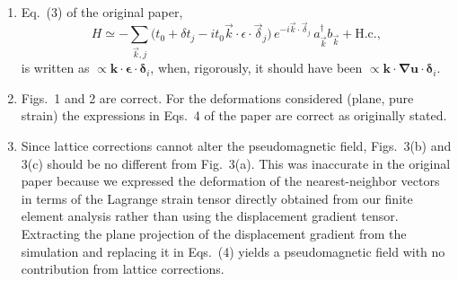 \begin{enumerate}
  \item Eq.~(3) of the original paper,
\begin{equation*}
  H \simeq -\sum_{\vec{k},j} \bigl(
  t_0 + \delta t_j - it_0\vec{k}\cdot\epsilon\cdot\vec{\delta}_j
  \bigr) \, e^{-i\vec{k}\cdot\vec{\delta}_j} \,
  a_{\vec{k}}^{\dagger}b_{\vec{k}} + \text{H.c.}
  ,
\end{equation*}
is written as $\propto \bm{k}\cdot\bm{\epsilon}\cdot\bm{\delta}_i$, when, rigorously, it should have been $\propto\bm{k}\cdot\bm{\nabla u}\cdot\bm{\delta}_i$.
  \item Figs.~1 and 2 are correct.  For the deformations considered (plane, pure strain) the expressions in Eqs.~4 of the paper are correct as originally stated.
  \item Since lattice corrections cannot alter the pseudomagnetic field, Figs.~3(b) and 3(c) should be no different from Fig.~3(a).  This was inaccurate in the original paper because we expressed the deformation of the nearest-neighbor vectors in terms of the Lagrange strain tensor directly obtained from our finite element analysis rather than using the displacement gradient tensor. Extracting the plane projection of the displacement gradient from the simulation and replacing it in Eqs.~(4) yields a pseudomagnetic field with no contribution from lattice corrections. 
\end{enumerate}